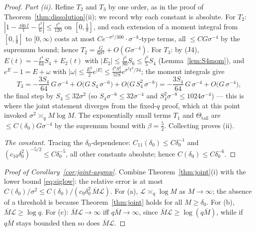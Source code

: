 \begin{proof}
\emph{Part (ii).} Refine $T_2$ and $T_3$ by one order, as in the proof
of Theorem~\ref{thm:dissolution}(ii); we record why each constant is
absolute. For $T_2$: $|1-\tfrac{\sin t}t-\tfrac{t^2}6|\le
\tfrac{t^4}{120}$ on $[0,\tfrac18]$, and each extension of a moment
integral from $[0,\tfrac18]$ to $[0,\infty)$ costs at most
$Ce^{-\sigma^2/300}\cdot\sigma^{-k}$-type terms, all $\le CG\sigma^{-4}$
by the supremum bound; hence
$T_2=\tfrac{G}{6\sigma^2}+O(G\sigma^{-4})$. For $T_3$: by (J4),
$E(t)=-\tfrac{t^4}{64}S_4+E_2(t)$ with
$|E_2|\le\tfrac{t^6}{80}S_6\le\tfrac{t^6}{5}S_4$
(Lemma~\ref{lem:S4mom}), and $e^E-1=E+\omega$ with
$|\omega|\le\tfrac{E^2}2e^{|E|}\le\tfrac{t^8S_4^2}{578}
e^{\sigma^2t^2/34}$; the moment integrals give
\[
T_3=-\frac{3S_4}{64}\,G\,\sigma^{-4}
+O\bigl(G\,S_4\,\sigma^{-6}\bigr)
+O\bigl(G\,S_4^{2}\,\sigma^{-8}\bigr)
=-\frac{3S_4}{64}\,G\,\sigma^{-4}+O\bigl(G\,\sigma^{-4}\bigr),
\]
the final step by $S_4\le32\sigma^2$ (so $S_4\sigma^{-6}\le32\sigma^{-4}$
and $S_4^2\sigma^{-8}\le1024\sigma^{-4}$) --- this is where the joint
statement diverges from the fixed-$q$ proof, which at this point
invoked $\sigma^2\asymp_qM\log M$. The exponentially small terms
$T_1$ and $\Theta_{\mathrm{tail}}$ are $\le C(\delta_0)G\sigma^{-4}$
by the supremum bound with $\beta=\tfrac52$. Collecting proves (ii).

\emph{The constant.} Tracing the $\delta_0$-dependence:
$C_{11}(\delta_0)\le C\delta_0^{-1}$ and
$(c_{10}\delta_0^{2})^{-5/2}\le C\delta_0^{-5}$, all other constants
absolute; hence $C(\delta_0)\le C\delta_0^{-6}$.
\end{proof}

\begin{proof}[Proof of Corollary~\ref{cor:joint-asymp}]
Combine Theorem~\ref{thm:joint}(i) with the lower bound
\eqref{eq:siglow}: the relative error is at most
$C(\delta_0)/\sigma^2\le C(\delta_0)/(c_9\delta_0^2\,\overline
M\mathcal L)$. For (a), $\mathcal L\asymp_q\log M$ as $M\to\infty$; the
absence of a threshold is because Theorem~\ref{thm:joint} holds for
all $M\ge\delta_0$. For (b), $\overline M\mathcal L\ge\log q$. For
(c): $\overline M\mathcal L\to\infty$ iff $q\overline M\to\infty$,
since $\overline M\mathcal L\ge\log(q\overline M)$, while if
$q\overline M$ stays bounded then so does $\overline M\mathcal L$.
\end{proof}


